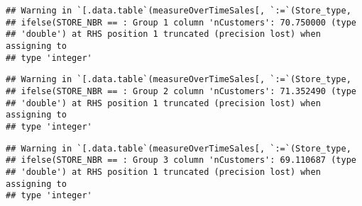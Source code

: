 \documentclass[
]{article}
\newenvironment{Shaded}{\begin{snugshade}}{\end{snugshade}}
\newcommand{\DataTypeTok}[1]{\textcolor[rgb]{0.13,0.29,0.53}{#1}}
\newcommand{\DecValTok}[1]{\textcolor[rgb]{0.00,0.00,0.81}{#1}}
\newcommand{\ErrorTok}[1]{\textcolor[rgb]{0.64,0.00,0.00}{\textbf{#1}}}
\newcommand{\KeywordTok}[1]{\textcolor[rgb]{0.13,0.29,0.53}{\textbf{#1}}}
\newcommand{\NormalTok}[1]{#1}
\newcommand{\OperatorTok}[1]{\textcolor[rgb]{0.81,0.36,0.00}{\textbf{#1}}}
\newcommand{\StringTok}[1]{\textcolor[rgb]{0.31,0.60,0.02}{#1}}
\begin{document}
\begin{Shaded}
\end{Shaded}

\begin{verbatim}
## Warning in `[.data.table`(measureOverTimeSales[, `:=`(Store_type,
## ifelse(STORE_NBR == : Group 1 column 'nCustomers': 70.750000 (type
## 'double') at RHS position 1 truncated (precision lost) when assigning to
## type 'integer'
\end{verbatim}

\begin{verbatim}
## Warning in `[.data.table`(measureOverTimeSales[, `:=`(Store_type,
## ifelse(STORE_NBR == : Group 2 column 'nCustomers': 71.352490 (type
## 'double') at RHS position 1 truncated (precision lost) when assigning to
## type 'integer'
\end{verbatim}

\begin{verbatim}
## Warning in `[.data.table`(measureOverTimeSales[, `:=`(Store_type,
## ifelse(STORE_NBR == : Group 3 column 'nCustomers': 69.110687 (type
## 'double') at RHS position 1 truncated (precision lost) when assigning to
## type 'integer'
\end{verbatim}
\end{document}
